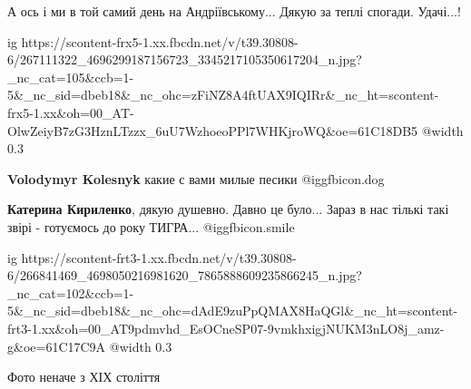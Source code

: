  
 
 
 
 

А ось і ми в той самий день на Андріївському...
Дякую за теплі спогади.
Удачі...!

\ifcmt
  ig https://scontent-frx5-1.xx.fbcdn.net/v/t39.30808-6/267111322_4696299187156723_3345217105350617204_n.jpg?_nc_cat=105&ccb=1-5&_nc_sid=dbeb18&_nc_ohc=zFiNZ8A4ftUAX9IQIRr&_nc_ht=scontent-frx5-1.xx&oh=00_AT-OlwZeiyB7zG3HznLTzzx_6uU7WzhoeoPPl7WHKjroWQ&oe=61C18DB5
  @width 0.3
\fi

\textbf{Volodymyr Kolesnyk} какие с вами милые песики  @igg{fbicon.dog} 

\textbf{Катерина Кириленко}, дякую душевно. Давно це було... Зараз в нас тількі такі звірі - готуємось до року ТИГРА... @igg{fbicon.smile} 

\ifcmt
  ig https://scontent-frt3-1.xx.fbcdn.net/v/t39.30808-6/266841469_4698050216981620_7865888609235866245_n.jpg?_nc_cat=102&ccb=1-5&_nc_sid=dbeb18&_nc_ohc=dAdE9zuPpQMAX8HaQGl&_nc_ht=scontent-frt3-1.xx&oh=00_AT9pdmvhd_EsOCneSP07-9vmkhxigjNUKM3nLO8j_amz-g&oe=61C17C9A
  @width 0.3
\fi

Фото неначе з ХІХ століття

